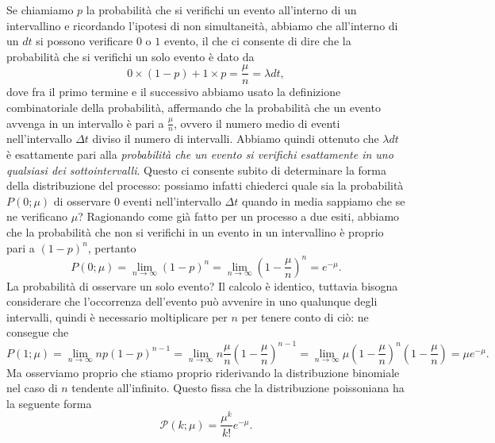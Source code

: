 \documentclass{report}
\begin{document}
Se chiamiamo $p$ la probabilità che si verifichi un evento all'interno di un intervallino e ricordando l'ipotesi di non simultaneità, abbiamo che all'interno di un $dt$ si possono verificare $0$ o $1$ evento, il che ci consente di dire che la probabilità che si verifichi un solo evento è dato da
$$
0 \times (1-p) + 1 \times p = \frac{\mu}{n} = \lambda dt,
$$
dove fra il primo termine e il successivo abbiamo usato la definizione combinatoriale della probabilità, affermando che la probabilità che un evento avvenga in un intervallo è pari a $\frac{\mu}{n}$, ovvero il numero medio di eventi nell'intervallo $\Delta t$ diviso il numero di intervalli. Abbiamo quindi ottenuto che $\lambda dt$ è esattamente pari alla \emph{probabilità che un evento si verifichi esattamente in uno qualsiasi dei sottointervalli}. Questo ci consente subito di determinare la forma della distribuzione del processo: possiamo infatti chiederci quale sia la probabilità $P(0; \mu)$ di osservare $0$ eventi nell'intervallo $\Delta t$ quando in media sappiamo che se ne verificano $\mu$? Ragionando come già fatto per un processo a due esiti, abbiamo che la probabilità che non si verifichi in un evento in un intervallino è proprio pari a $(1-p)^n$, pertanto
$$
	P(0; \mu) = \lim_{n \to \infty} (1 - p)^n = \lim_{n \to \infty} (1 - \frac{\mu}{n})^n = e^{-\mu}. 
$$
La probabilità di osservare un solo evento? Il calcolo è identico, tuttavia bisogna considerare che l'occorrenza dell'evento può avvenire in uno qualunque degli intervalli, quindi è necessario moltiplicare per $n$ per tenere conto di ciò: ne consegue che
$$
	P(1; \mu) = \lim_{n \to \infty} np(1-p)^{n-1} = \lim_{n \to \infty} n \frac{\mu}{n} (1 - \frac{\mu}{n})^{n-1} = \lim_{n \to \infty} \mu (1 - \frac{\mu}{n})^n (1 - \frac{\mu}{n}) = \mu e^{-\mu}.
$$
Ma osserviamo proprio che stiamo proprio riderivando la distribuzione binomiale nel caso di $n$ tendente all'infinito. Questo fissa che la distribuzione poissoniana ha la seguente forma
\begin{equation}
	\mathcal{P}(k; \mu) = \frac{\mu^k}{k!} e^{-\mu}.
	\label{eq:poisson_fin}
\end{equation}
\end{document}
